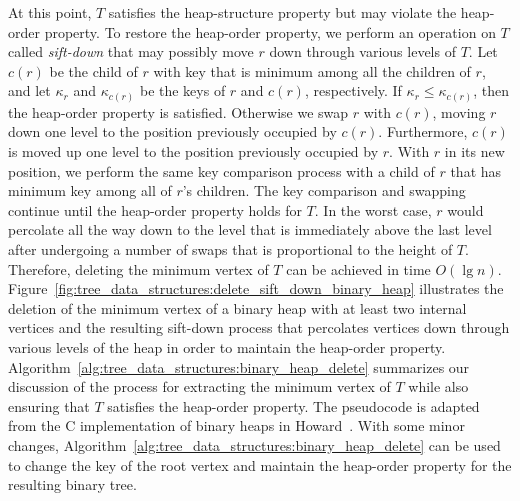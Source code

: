 At this point, $T$ satisfies the heap-structure property but may
violate the heap-order property. To restore the heap-order property,
we perform an operation on $T$ called
\emph{sift-down} that may possibly move
$r$ down through various levels of $T$. Let $c(r)$ be the child of $r$
with key that is minimum among all the children of $r$, and let
$\kappa_r$ and $\kappa_{c(r)}$ be the keys of $r$ and $c(r)$,
respectively. If $\kappa_r \leq \kappa_{c(r)}$, then the heap-order
property is satisfied. Otherwise we swap $r$ with $c(r)$, moving $r$
down one level to the position previously occupied by
$c(r)$. Furthermore, $c(r)$ is moved up one level to the position
previously occupied by $r$. With $r$ in its new position, we perform
the same key comparison process with a child of $r$ that has minimum
key among all of $r$'s children. The key comparison and swapping
continue until the heap-order property holds for $T$. In the worst
case, $r$ would percolate all the way down to the level that is
immediately above the last level after undergoing a number of swaps
that is proportional to the height of $T$. Therefore, deleting the
minimum vertex of $T$ can be achieved in time $O(\lg n)$.
Figure~\ref{fig:tree_data_structures:delete_sift_down_binary_heap}
illustrates the deletion of the minimum vertex of a binary heap with
at least two internal vertices and the resulting sift-down process
that percolates vertices down through various levels of the heap in
order to maintain the heap-order property.
Algorithm~\ref{alg:tree_data_structures:binary_heap_delete} summarizes
our discussion of the process for extracting the minimum vertex of $T$
while also ensuring that $T$ satisfies the heap-order property. The
pseudocode is adapted from the C implementation of binary heaps in
Howard~\cite{Howard2010}. With some minor changes,
Algorithm~\ref{alg:tree_data_structures:binary_heap_delete} can be
used to change the key of the root vertex and maintain the heap-order
property for the resulting binary tree.

